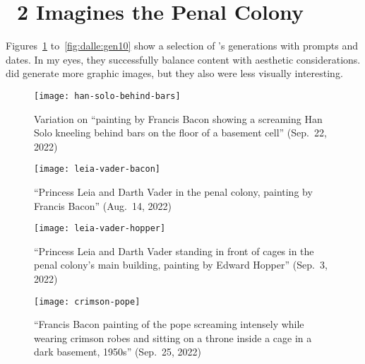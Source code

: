 
\newpage
\section{\dalle~2 Imagines the Penal Colony}
\label{adx:dalle:fromkafkawithlove}

Figures~\ref{fig:dalle:gen1} to~\ref{fig:dalle:gen10} show a selection of
\dalle's generations with prompts and dates. In my eyes, they successfully
balance content with aesthetic considerations. \dalle{} did generate more
graphic images, but they also were less visually interesting.

\begin{figure}[h!]
\centering
\begin{minipage}[t]{0.48\textwidth}
    \centering
    \vspace{2em}
    \texttt{[image: han-solo-behind-bars]}
    \caption{Variation on ``painting by Francis Bacon showing a screaming Han
        Solo kneeling behind bars on the floor of a basement cell'' (Sep.\ 22,
        2022)}
    \label{fig:dalle:gen1}
\end{minipage}
\hfill
\begin{minipage}[t]{0.48\textwidth}
    \centering
    \vspace{2em}
    \texttt{[image: leia-vader-bacon]}
    \caption{``Princess Leia and Darth Vader in the penal colony, painting by
        Francis Bacon'' (Aug.\ 14, 2022)}
\end{minipage}
\end{figure}

\begin{figure}[h!]
\begin{minipage}[t]{0.48\textwidth}
    \centering
    \vspace{2.5em}
    \texttt{[image: leia-vader-hopper]}
    \caption{``Princess Leia and Darth Vader standing in front of cages in the
        penal colony's main building, painting by Edward Hopper'' (Sep.\ 3,
        2022)}
\end{minipage}
\hfill
\begin{minipage}[t]{0.48\textwidth}
    \centering
    \vspace{2.5em}
    \texttt{[image: crimson-pope]}
    \caption{``Francis Bacon painting of the pope screaming intensely while
        wearing crimson robes and sitting on a throne inside a cage in a dark
        basement, 1950s'' (Sep.\ 25, 2022)}
\end{minipage}
\end{figure}

